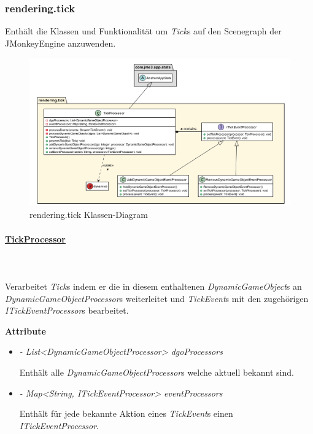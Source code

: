 \subsubsection{rendering.tick}
    Enthält die Klassen und Funktionalität um \textit{Tick}s auf den Scenegraph der JMonkeyEngine anzuwenden.\par

    \begin{figure}[htbp]
        \centering
        \includegraphics[width=\linewidth]{Interface/render-tick.png}
        \caption{rendering.tick Klassen-Diagram}
    \end{figure}

        \paragraph{\underline{TickProcessor}} \mbox{}\\
        \\
            Verarbeitet \textit{Tick}s indem er die in diesem enthaltenen \textit{DynamicGameObject}s an
            \textit{DynamicGameObjectProcessor}s weiterleitet und \textit{TickEvent}s mit den zugehörigen \textit{ITickEventProcessor}s bearbeitet.\par
                    
            \textbf{Attribute}
            \begin{itemize}
                \item \textit{- List<DynamicGameObjectProcessor> dgoProcessors}
                    \begin{leftbar}[0.9\linewidth]
                        Enthält alle \textit{DynamicGameObjectProcessor}s welche aktuell bekannt sind.
                    \end{leftbar}
                \item \textit{- Map<String, ITickEventProcessor> eventProcessors}
                    \begin{leftbar}[0.9\linewidth]
                        Enthält für jede bekannte Aktion eines \textit{TickEvent}s einen \textit{ITickEventProcessor}.
                    \end{leftbar}
            \end{itemize}

